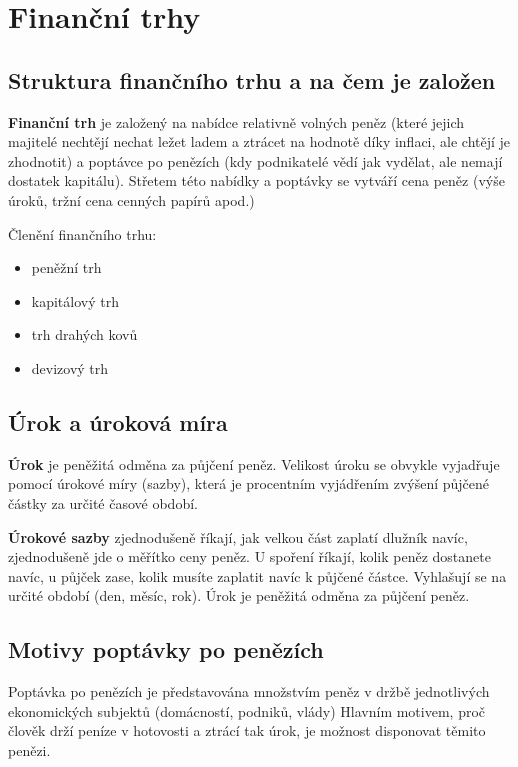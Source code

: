 \chapter{Finanční trhy}

\section*{Struktura finančního trhu a na čem je založen}

\textbf{Finanční trh} je založený na nabídce relativně volných peněz (které jejich majitelé nechtějí nechat ležet ladem a ztrácet na hodnotě díky inflaci, ale chtějí je zhodnotit) a poptávce po penězích (kdy podnikatelé vědí jak vydělat, ale nemají dostatek kapitálu). Střetem této nabídky a poptávky se vytváří cena peněz (výše úroků, tržní cena cenných papírů apod.)

Členění finančního trhu:
\begin{itemize}
    \item peněžní trh
    \item kapitálový trh
    \item trh drahých kovů
    \item devizový trh
\end{itemize}

\section*{Úrok a úroková míra}

\textbf{Úrok} je peněžitá odměna za půjčení peněz. Velikost úroku se obvykle vyjadřuje pomocí úrokové míry (sazby), která je procentním vyjádřením zvýšení půjčené částky za určité časové období.

\textbf{Úrokové sazby} zjednodušeně říkají, jak velkou část zaplatí dlužník navíc, zjednodušeně jde o měřítko ceny peněz. U spoření říkají, kolik peněz dostanete navíc, u půjček zase, kolik musíte zaplatit navíc k půjčené částce. Vyhlašují se na určité období (den, měsíc, rok). Úrok je peněžitá odměna za půjčení peněz.

\section*{Motivy poptávky po penězích}

Poptávka po penězích je představována množstvím peněz v držbě jednotlivých ekonomických subjektů (domácností, podniků, vlády) Hlavním motivem, proč člověk drží peníze v hotovosti a ztrácí tak úrok, je možnost disponovat těmito penězi.

